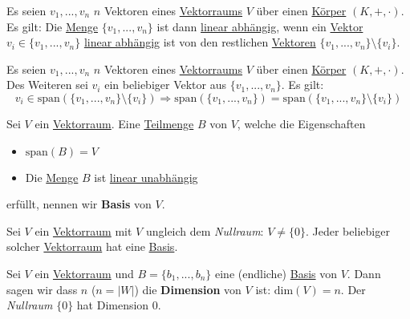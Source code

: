 \documentclass[../../main.tex]{subfiles}
\begin{document}
	\begin{theorem}
		Es seien $v_1,...,v_n$ $n$ Vektoren eines \hyperref[def:Vektorraum]{Vektorraums} $V$ über einen \hyperref[def:Körper]{Körper} $(K,+,\cdot)$. Es gilt: Die \hyperref[def:Menge]{Menge} $\{v_1,...,v_n\}$ ist dann \hyperref[def:LineareAbhängigkeitMenge]{linear abhängig}, wenn ein \hyperref[def:Vektor]{Vektor} $v_i \in\{v_1,...,v_n\}$ \hyperref[def:LineareAbhängigkeit]{linear abhängig} ist von den restlichen \hyperref[def:Vektor]{Vektoren} $\{v_1,...,v_n\}\setminus \{v_i\}$. 
	\end{theorem}

	\begin{theorem}
		Es seien $v_1,...,v_n$ $n$ Vektoren eines \hyperref[def:Vektorraum]{Vektorraums} $V$ über einen \hyperref[def:Körper]{Körper} $(K,+,\cdot)$. Des Weiteren sei $v_i$ ein beliebiger Vektor aus $\{v_1,...,v_n\}$. Es gilt: $$v_i \in \textrm{span}(\{v_1,...,v_n\}\setminus\{v_i\}) \Rightarrow \textrm{span}(\{v_1,...,v_n\}) = \textrm{span}(\{v_1,...,v_n\}\setminus\{v_i\})$$
	\end{theorem}

	\begin{definition}[Basis]
		\label{def:Basis}
		Sei $V$ ein \hyperref[def:Vektorraum]{Vektorraum}. Eine \hyperref[def:Teilmenge]{Teilmenge} $B$ von $V$, welche die Eigenschaften
		\begin{itemize}
			\item $\textrm{span}(B) = V$
			\item Die \hyperref[def:Menge]{Menge} $B$ ist \hyperref[def:LineareUnabhängigkeitMenge]{linear unabhängig}
		\end{itemize}
		erfüllt, nennen wir \textbf{Basis} von $V$. 
	\end{definition}

	\begin{theorem}
		Sei $V$ ein \hyperref[def:Vektorraum]{Vektorraum} mit $V$ ungleich dem \textit{Nullraum}: $V\not = \{0\}$. Jeder beliebiger solcher \hyperref[def:Vektorraum]{Vektorraum} hat eine \hyperref[def:Basis]{Basis}.
	\end{theorem}

	\begin{definition}[Dimension]
		\label{def:Dimension}
		Sei $V$ ein \hyperref[def:Vektorraum]{Vektorraum} und $B = \{b_1,...,b_n\}$ eine (endliche) \hyperref[def:Basis]{Basis} von $V$. Dann sagen wir dass $n$ ($n=|W|$) die \textbf{Dimension} von $V$ ist: $\textrm{dim}(V)=n$. Der \textit{Nullraum} $\{0\}$ hat Dimension 0. 
	\end{definition}
\end{document}
